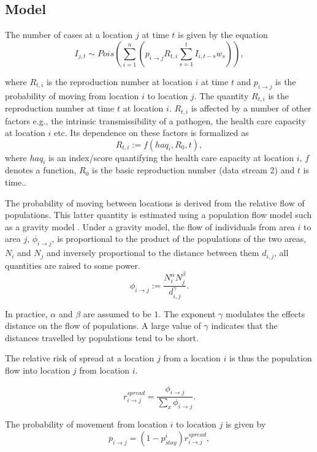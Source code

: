 \documentclass[a4paper,12pt]{article}
\begin{document}
 \subsection{Model}
 The number of cases at a location \(j\) at time \(t\) is given by the equation
\[
  I_{j, t} \sim Pois\left( \sum_{i = 1}^{n} {\left( p_{i \rightarrow j}
  R_{t, i} \sum_{s = 1}^{t}{I_{i, t - s} w_{s}}\right)} \right),
\]

where \(R_{t, i}\) is the reproduction number at location \(i\) at time
\(t\) and \(p_{i \rightarrow j}\) is the probability of moving from
location \(i\) to location \(j\). The quantity $R_{t, i}$ is the
reproduction number at time $t$ at location $i$. $R_{t, i}$ is
affected by a number of other factors e.g., the intrinsic
transmissibility of a pathogen, the health care capacity at location
$i$ etc. Its dependence on these factors is formalized as
\[ R_{t, i} := f(haq_i, R_0, t),\]
where $haq_i$ is an index/score quantifying the health care capacity at location 
$i$, $f$ denotes a function, $R_0$ is the basic reproduction number (data stream 2) and $t$ is time..

The probability of moving between locations is derived from the
relative flow of populations.
This latter quantity is estimated using a population flow
model such as a gravity model \citep{grosche2007175}. Under a gravity model, the flow of individuals from area \(i\) to area \(j\),
\(\phi_{i \rightarrow j}\), is proportional to the product of the
populations of the two areas, \(N_i\) and \(N_j\) and inversely
proportional to the distance between them \(d_{i, j}\), all quantities
are raised to some power.
\[
  \phi_{i \rightarrow j} :=  \frac{N_i^{\alpha}N_j^{\beta}}{d_{i, j}^{\gamma}}.
\]

In practice, \( \alpha \) and \( \beta \) are assumed to be $1$. The
exponent \( \gamma \) modulates the effects distance on the flow of
populations. A large value of \( \gamma \) indicates that the
distances travelled by populations tend to be short.

The relative risk of spread at a location \(j\) from a location \(i\)
is thus the population flow into location \(j\) from location \(i\).

\[
  r_{i \rightarrow j}^{spread} = \frac{\phi_{i \rightarrow
  j}}{\sum_{x}{\phi_{i \rightarrow
  j}}}.
\]

The probability of movement from location \(i\) to location \(j\) is given by
\[  p_{i \rightarrow j} = (1 - p_{stay}^i) r_{i \rightarrow j}^{spread},\]
\end{document}
